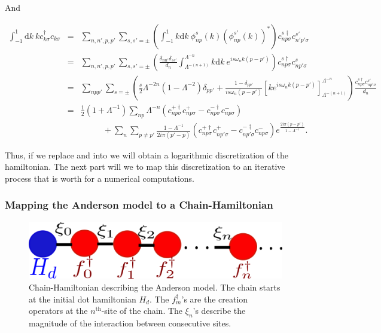 And 

\begin{eqnarray}
\int_{-1}^{1}\mbox{d}k\ kc_{k\sigma}^{\dagger}c_{k\sigma} & = & \sum_{n,n',p,p'}\sum_{s,s'=\pm}\left(\int_{-1}^{1}k\mbox{d}k\ \phi_{np}^{s}(k)\left(\phi_{np}^{s'}(k)\right)^{*}\right)c_{np\sigma}^{s\dagger}c_{n'p'\sigma}^{s'}\nonumber \\
 & = & \sum_{n,n',p,p'}\sum_{s,s'=\pm}\left(\frac{\delta_{nn'}\delta_{ss'}}{d_{n}}\int_{\Lambda^{-(n+1)}}^{\Lambda^{-n}}k\mbox{d}k\ e^{is\omega_{n}k\left(p-p'\right)}\right)c_{np\sigma}^{s\dagger}c_{np'\sigma}^{s}\nonumber \\
 & = & \sum_{npp'}\sum_{s=\pm}\left(\frac{s}{2}\Lambda^{-2n}\left(1-\Lambda^{-2}\right)\delta_{pp'}+\frac{1-\delta_{pp'}}{is\omega_{n}\left(p-p'\right)}\left[ke^{is\omega_{n}k\left(p-p'\right)}\right]_{\Lambda^{-(n+1)}}^{\Lambda^{-n}}\right)\frac{c_{np\sigma}^{s\dagger}c_{np'\sigma}^{s'}}{d_{n}}\nonumber \\
 & = & \frac{1}{2}\left(1+\Lambda^{-1}\right)\sum_{np}\Lambda^{-n}\left(c_{np\sigma}^{+\dagger}c_{np\sigma}^{+}-c_{np\sigma}^{-\dagger}c_{np\sigma}^{-}\right)\nonumber \\
 &  & \ \ \ \ \ \ \!\ \ \ \ \!\ \ +\sum_{n}\sum_{p\neq p'}\frac{1-\Lambda^{-1}}{2i\pi\left(p'-p\right)}\left(c_{np\sigma}^{+\dagger}c_{np'\sigma}^{+}-c_{np'\sigma}^{-\dagger}c_{np\sigma}^{-}\right)e^{\frac{2i\pi\left(p-p'\right)}{1-\Lambda^{-1}}}.\label{eq:second-integral}
\end{eqnarray}


Thus, if we replace  and 
into  we will obtain a logarithmic discretization
of the hamiltonian. The next part will we to map this discretization
to an iterative process that is worth for a numerical computations. 

\subsubsection{Mapping the Anderson model to a Chain-Hamiltonian}

\begin{figure}[h]
\centering
\includegraphics[scale=0.5]{IMAGES/NRGchain.png}\caption{\label{FigNRG-chain} Chain-Hamiltonian describing the Anderson model.
The chain starts at the initial dot hamiltonian $H_{d}$. The $f_{m}^{\dagger}$'s
are the creation operators at the $n^{\mbox{th}}$-site of the chain.
The $\xi_{n}$'s describe the magnitude of the interaction between
consecutive sites. }
\end{figure}


